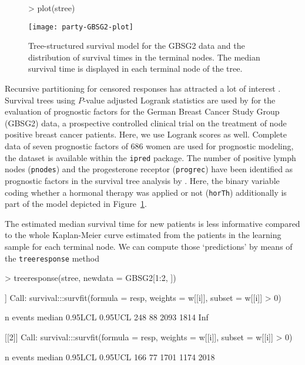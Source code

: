 \documentclass[letter]{article}
\begin{document}
\begin{figure}[t]
\begin{center}
\begin{Schunk}
\begin{Sinput}
> plot(stree)
\end{Sinput}
\end{Schunk}
\texttt{[image: party-GBSG2-plot]}
\caption{Tree-structured survival model for the GBSG2 data and the distribution of 
survival times in the terminal nodes. The median survival time is displayed in
each terminal node of the tree. \label{gbsg2}}
\end{center}
\end{figure}  


Recursive partitioning for censored responses has attracted a lot of interest
\citep[e.g.,][]{regression:1988,relative-r:1992}. 
Survival trees using $P$-value adjusted Logrank statistics
are used by \cite{statistics:2001a} 
for the evaluation of prognostic factors for the German Breast
Cancer Study Group (GBSG2) data,  a prospective controlled clinical trial on the
treatment of node positive breast cancer patients. Here, we use
Logrank scores as well. Complete data of seven prognostic factors of $686$
women are used for prognostic modeling, the
dataset is available within the 
\texttt{ipred} package.
The number of positive lymph nodes
(\texttt{pnodes}) and the progesterone receptor (\texttt{progrec}) have
been identified as prognostic factors in the survival tree analysis
by \cite{statistics:2001a}.  Here, the binary variable coding whether a
hormonal therapy was applied or not (\texttt{horTh}) additionally is
part of the model depicted in Figure~\ref{gbsg2}.

The estimated median survival time for new patients is less informative
compared to the whole Kaplan-Meier curve estimated from the patients in the
learning sample for each terminal node. We can compute those `predictions'
by means of the \texttt{treeresponse} method
\begin{Schunk}
\begin{Sinput}
> treeresponse(stree, newdata = GBSG2[1:2, ])
\end{Sinput}
\begin{Soutput}
[[1]]
Call: survival:::survfit(formula = resp, weights = w[[i]], subset = w[[i]] > 
    0)

      n  events  median 0.95LCL 0.95UCL 
    248      88    2093    1814     Inf 

[[2]]
Call: survival:::survfit(formula = resp, weights = w[[i]], subset = w[[i]] > 
    0)

      n  events  median 0.95LCL 0.95UCL 
    166      77    1701    1174    2018 
\end{Soutput}
\end{Schunk}
\end{document}
